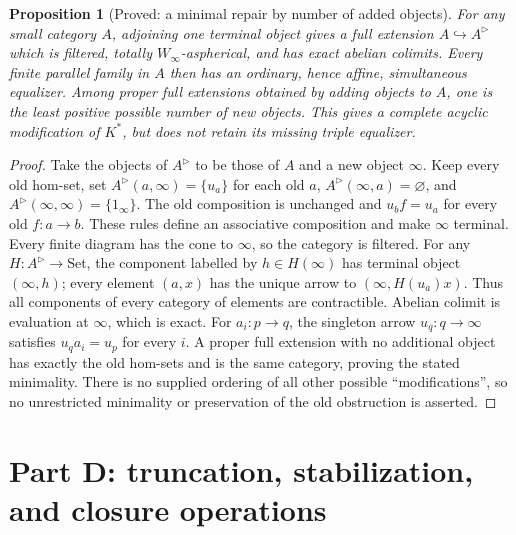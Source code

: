 \documentclass[11pt,a4paper]{article}
\newtheorem{proposition}[theorem]{Proposition}
\theoremstyle{definition}
\begin{document}
\begin{proposition}[Proved: a minimal repair by number of added objects]
\label{C:terminal-repair}
For any small category $A$, adjoining one terminal object gives a full
extension $A\hookrightarrow A^{\triangleright}$ which is filtered,
totally $W_\infty$-aspherical, and has exact abelian colimits.
Every finite parallel family in $A$ then has an ordinary, hence affine,
simultaneous equalizer.  Among proper full extensions obtained by adding
objects to $A$, one is the least positive possible number of new objects.
This gives a complete acyclic modification of $K^*$, but does not retain
its missing triple equalizer.
\end{proposition}
\begin{proof}
Take the objects of $A^{\triangleright}$ to be those of $A$ and a new
object $\infty$.  Keep every old hom-set, set
$A^{\triangleright}(a,\infty)=\{u_a\}$ for each old $a$,
$A^{\triangleright}(\infty,a)=\varnothing$, and
$A^{\triangleright}(\infty,\infty)=\{1_\infty\}$.
The old composition is unchanged and $u_b f=u_a$ for every old
$f:a\to b$.  These rules define an associative composition and make
$\infty$ terminal.  Every finite diagram has the cone to $\infty$,
so the category is filtered.  For any $H:A^{\triangleright}\to\mathrm{Set}$,
the component labelled by $h\in H(\infty)$ has terminal object
$(\infty,h)$; every element $(a,x)$ has the unique arrow to
$(\infty,H(u_a)x)$.  Thus all components of every category of elements
are contractible.  Abelian colimit is evaluation at $\infty$, which is
exact.  For $a_i:p\to q$, the singleton arrow $u_q:q\to\infty$
satisfies $u_q a_i=u_p$ for every $i$.
A proper full extension with no additional object has exactly the old
hom-sets and is the same category, proving the stated minimality.
There is no supplied ordering of all other possible ``modifications'',
so no unrestricted minimality or preservation of the old obstruction is
asserted.
\end{proof}
\section{Part D: truncation, stabilization, and closure operations}\label{sec:D}
\end{document}
